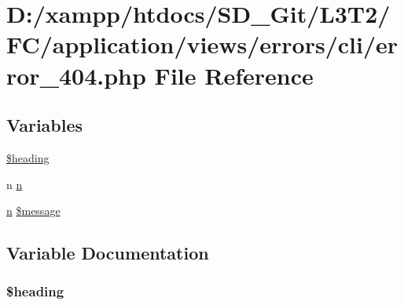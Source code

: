 \hypertarget{application_2views_2errors_2cli_2error__404_8php}{}\section{D\+:/xampp/htdocs/\+S\+D\+\_\+\+Git/\+L3\+T2/\+F\+C/application/views/errors/cli/error\+\_\+404.php File Reference}
\label{application_2views_2errors_2cli_2error__404_8php}
\subsection*{Variables}
\begin{DoxyCompactItemize}
\item 
\hyperlink{application_2views_2errors_2cli_2error__404_8php_a196169be7715d466e3310388b096598c}{\$heading}
\item 
n \hyperlink{application_2views_2errors_2cli_2error__404_8php_a958071ac50ebec838e917de66e151e7e}{n}
\item 
\hyperlink{_admin_2application_2views_2errors_2cli_2error__general_8php_ace0fd03cd383f20ce6ea63247a207294}{n} \hyperlink{application_2views_2errors_2cli_2error__404_8php_aaba2b6aee423b3b5e46000f90b4c8c7f}{\$message}
\end{DoxyCompactItemize}


\subsection{Variable Documentation}
\hypertarget{application_2views_2errors_2cli_2error__404_8php_a196169be7715d466e3310388b096598c}{}
\subsubsection[{\$heading}]{\setlength{\rightskip}{0pt plus 5cm}\$heading}\label{application_2views_2errors_2cli_2error__404_8php_a196169be7715d466e3310388b096598c}
\hypertarget{application_2views_2errors_2cli_2error__404_8php_aaba2b6aee423b3b5e46000f90b4c8c7f}{}
